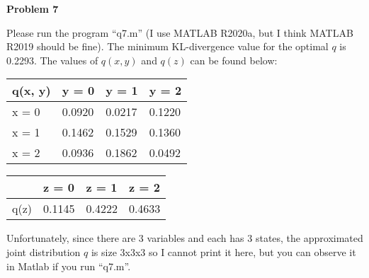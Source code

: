 \textbf{Problem 7}

Please run the program ``q7.m'' (I use MATLAB R2020a, but I think MATLAB R2019 should be fine). The minimum KL-divergence value for the optimal $q$ is 0.2293. The values of $q(x, y)$ and $q(z)$ can be found below:

\begin{table}[h]
	\begin{tabular}{|l|l|l|l|}
		\hline
		q(x, y) & y = 0  & y = 1  & y = 2  \\ \hline
		x = 0 & 0.0920 & 0.0217 & 0.1220 \\ \hline
		x = 1 & 0.1462 & 0.1529 & 0.1360 \\ \hline
		x = 2 & 0.0936 & 0.1862 & 0.0492 \\ \hline
	\end{tabular}
\end{table}

\begin{table}[h]
	\begin{tabular}{|l|l|l|l|}
		\hline
		& z = 0  & z = 1  & z = 2  \\ \hline
		q(z) & 0.1145 & 0.4222 & 0.4633 \\ \hline
	\end{tabular}
\end{table}

Unfortunately, since there are 3 variables and each has 3 states, the approximated joint distribution $q$ is size 3x3x3 so I cannot print it here, but you can observe it in Matlab if you run ``q7.m''.